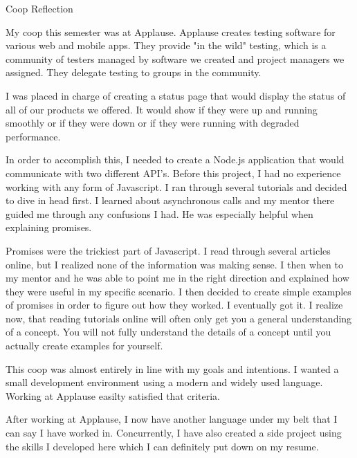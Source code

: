 \documentclass[12pt]{article}
\begin{document}
\centerline{Coop Reflection}

My coop this semester was at Applause. Applause creates testing software for
various web and mobile apps. They provide "in the wild" testing, which is a
community of testers managed by software we created and project managers we
assigned. They delegate testing to groups in the community.

I was placed in charge of creating a status page that would display the status
of all of our products we offered. It would show if they were up and running
smoothly or if they were down or if they were running with degraded performance.

In order to accomplish this, I needed to create a Node.js application that would
communicate with two different API's. Before this project, I had no experience
working with any form of Javascript. I ran through several tutorials and decided
to dive in head first. I learned about asynchronous calls and my mentor there
guided me through any confusions I had. He was especially helpful when
explaining promises.

Promises were the trickiest part of Javascript. I read through several articles
online, but I realized none of the information was making sense. I then when to
my mentor and he was able to point me in the right direction and explained how
they were useful in my specific scenario. I then decided to create simple
examples of promises in order to figure out how they worked. I eventually got
it. I realize now, that reading tutorials online will often only get you a
general understanding of a concept. You will not fully understand the details of
a concept until you actually create examples for yourself.

This coop was almost entirely in line with my goals and intentions. I wanted a
small development environment using a modern and widely used language. Working
at Applause easilty satisfied that criteria.

After working at Applause, I now have another language under my belt that I can
say I have worked in. Concurrently, I have also created a side project using the
skills I developed here which I can definitely put down on my resume.
\end{document}
